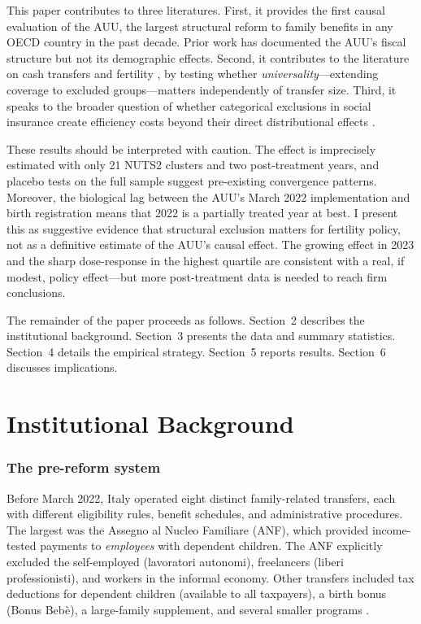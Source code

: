\documentclass[12pt]{article}
\begin{document}
This paper contributes to three literatures. First, it provides the first causal evaluation of the AUU, the largest structural reform to family benefits in any OECD country in the past decade. Prior work has documented the AUU's fiscal structure \citep{ferrara2023auu} but not its demographic effects. Second, it contributes to the literature on cash transfers and fertility \citep{gonzalez2013effect, milligan2005subsidizing, cohen2013effect, laroque2008does}, by testing whether \textit{universality}---extending coverage to excluded groups---matters independently of transfer size. Third, it speaks to the broader question of whether categorical exclusions in social insurance create efficiency costs beyond their direct distributional effects \citep{currie2006take, bhargava2015low, finkelstein2019take}.

These results should be interpreted with caution. The effect is imprecisely estimated with only 21 NUTS2 clusters and two post-treatment years, and placebo tests on the full sample suggest pre-existing convergence patterns. Moreover, the biological lag between the AUU's March 2022 implementation and birth registration means that 2022 is a partially treated year at best. I present this as suggestive evidence that structural exclusion matters for fertility policy, not as a definitive estimate of the AUU's causal effect. The growing effect in 2023 and the sharp dose-response in the highest quartile are consistent with a real, if modest, policy effect---but more post-treatment data is needed to reach firm conclusions.

The remainder of the paper proceeds as follows. Section~2 describes the institutional background. Section~3 presents the data and summary statistics. Section~4 details the empirical strategy. Section~5 reports results. Section~6 discusses implications.


\section{Institutional Background}

\subsubsection*{The pre-reform system} Before March 2022, Italy operated eight distinct family-related transfers, each with different eligibility rules, benefit schedules, and administrative procedures. The largest was the Assegno al Nucleo Familiare (ANF), which provided income-tested payments to \textit{employees} with dependent children. The ANF explicitly excluded the self-employed (lavoratori autonomi), freelancers (liberi professionisti), and workers in the informal economy. Other transfers included tax deductions for dependent children (available to all taxpayers), a birth bonus (Bonus Beb\`{e}), a large-family supplement, and several smaller programs \citep{ferrara2023auu}.
\end{document}
